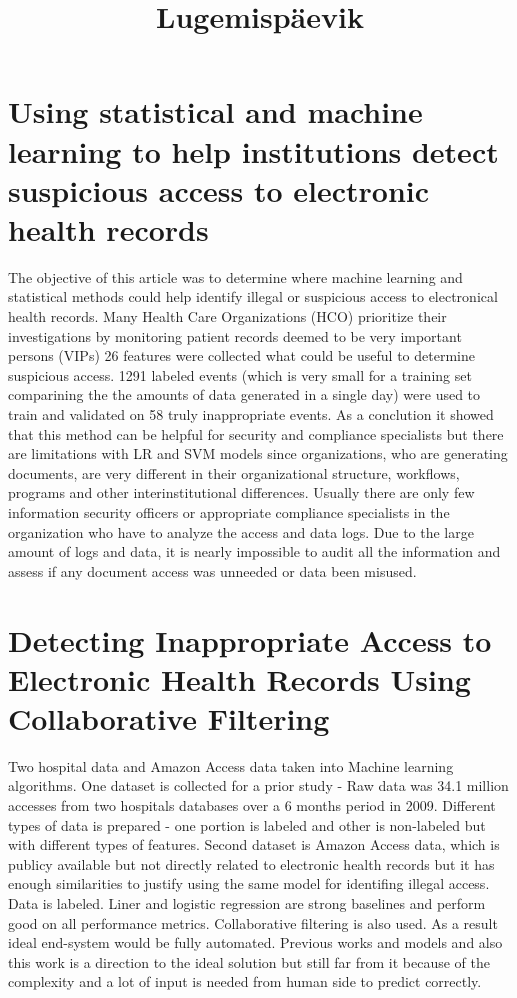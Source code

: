 \documentclass[12pt]{article}
\begin{document}
\title{Lugemispäevik}

\section{Using statistical and machine learning to help institutions detect suspicious access to electronic health records}
The objective of this article was to determine where machine learning and statistical methods could help identify illegal or suspicious access to electronical health records. 
Many Health Care Organizations (HCO) prioritize their investigations
by monitoring patient records deemed to be very important persons (VIPs)
26 features were collected what could be useful to determine suspicious access. 1291 labeled events (which is very small for a training set comparining the the amounts of data generated in a single day) were used to train and validated on 58 truly inappropriate events. As a conclution it showed that this method can be helpful for security and compliance specialists but there are limitations with LR and SVM models since organizations, who are generating documents, are very different in their organizational structure, workflows, programs and other interinstitutional differences. 
Usually there are only few information security officers or appropriate compliance specialists in the organization who have to analyze the access and data logs. 
Due to the large amount of logs and data, it is nearly impossible to audit all the information and assess if any document access was unneeded or data been misused.  \cite{10.1136/amiajnl-2011-000217}

\section{Detecting Inappropriate Access to Electronic Health Records Using Collaborative Filtering}
Two hospital data and Amazon Access data taken into Machine learning algorithms. One dataset is collected for a prior study - Raw data was 34.1 million accesses from two hospitals databases over a 6 months period in 2009.  Different types of data is prepared - one portion is labeled and other is non-labeled but with different types of features. 
Second dataset is Amazon Access data, which is publicy available but not directly related to electronic health records but it has enough similarities to justify using the same model for identifing illegal access. Data is labeled. 
Liner and logistic regression are strong baselines and perform good on all performance metrics.
Collaborative filtering is also used. 
As a result ideal end-system would be fully automated. Previous works and models and also this work is a direction to the ideal solution but still far from it because of the complexity and a lot of input is needed from human side to predict correctly. 
\cite{Menon2014}
\end{document}

